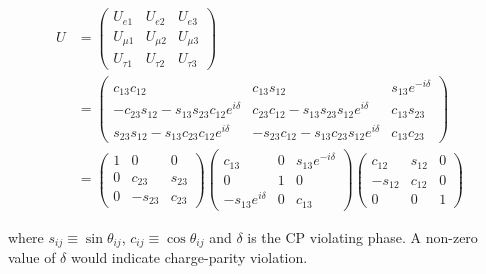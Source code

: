 \begin{align}
  U &= 
      \begin{pmatrix}
        U_{e1} & U_{e2} & U_{e3} \\
        U_{\mu 1} & U_{\mu 2} & U_{\mu 3} \\ 
        U_{\tau 1} & U_{\tau 2} & U_{\tau 3}
      \end{pmatrix}\\
    &=
      \begin{pmatrix}
        c_{13}c_{12} & c_{13}s_{12} & s_{13}e^{-i\delta} \\
        -c_{23}s_{12}-s_{13}s_{23}c_{12}e^{i\delta} &
        c_{23}c_{12}-s_{13}s_{23}s_{12}e^{i\delta} & c_{13}s_{23} \\ 
        s_{23}s_{12}-s_{13}c_{23}c_{12}e^{i\delta} &
        -s_{23}c_{12}-s_{13}c_{23}s_{12}e^{i\delta} & c_{13}c_{23} 
      \end{pmatrix}\\
    &=
      \begin{pmatrix}
        1 & 0 & 0 \\
        0 & c_{23} & s_{23} \\
        0 & -s_{23} & c_{23} 
      \end{pmatrix}
                      \begin{pmatrix}
                        c_{13}             & 0 & s_{13}e^{-i\delta} \\
                        0                  & 1 & 0                  \\
                        -s_{13}e^{i\delta} & 0 & c_{13}
                      \end{pmatrix}
                                                 \begin{pmatrix}
                                                   c_{12}  & s_{12} & 0 \\
                                                   -s_{12} & c_{12} & 0 \\
                                                   0       & 0      & 1
                                                 \end{pmatrix}
\label{eqn:PMNS}
\end{align}

\noindent where $s_{ij} \equiv \sin\theta_{ij}$, $c_{ij} \equiv
\cos\theta_{ij}$ and $\delta$ is the CP violating phase. A non-zero
value of $\delta$ would indicate charge-parity violation.



